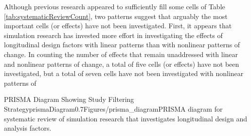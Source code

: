 \documentclass[
12pt, %
twoside,
english]{guelphthesis}
\begin{document}
Although previous research appeared to sufficiently fill some cells of Table \ref{tab:systematicReviewCount}, two patterns suggest that arguably the most important cells (or effects) have not been investigated. First, it appears that simulation research has invested more effort in investigating the effects of longitudinal design factors with linear patterns than with nonlinear patterns of change. In counting the number of effects that remain unaddressed with linear and nonlinear patterns of change, a total of five cells (or effects) have not been investigated, but a total of seven cells have not been investigated with nonlinear patterns of
\begin{apaFigure}[landscape][samepage][-0.4cm]{PRISMA Diagram Showing Study Filtering Strategy}{prismaDiagram}{0.7}{Figures/prisma_diagram}{PRISMA diagram for systematic review of simulation research that investigates longitudinal design and analysis factors.}\end{apaFigure}
\end{document}
